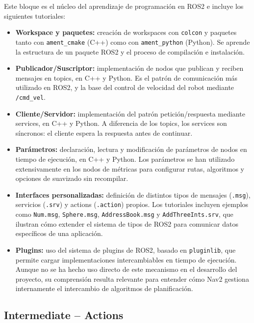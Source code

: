 Este bloque es el núcleo del aprendizaje de programación en ROS2 e incluye los siguientes tutoriales:

\begin{itemize}
    \item \textbf{Workspace y paquetes:} creación de workspaces con \texttt{colcon} y paquetes tanto con \texttt{ament\_cmake} (C++) como con \texttt{ament\_python} (Python). Se aprende la estructura de un paquete ROS2 y el proceso de compilación e instalación.

    \item \textbf{Publicador/Suscriptor:} implementación de nodos que publican y reciben mensajes en topics, en C++ y Python. Es el patrón de comunicación más utilizado en ROS2, y la base del control de velocidad del robot mediante \texttt{/cmd\_vel}.

    \item \textbf{Cliente/Servidor:} implementación del patrón petición/respuesta mediante services, en C++ y Python. A diferencia de los topics, los services son síncronos: el cliente espera la respuesta antes de continuar.

    \item \textbf{Parámetros:} declaración, lectura y modificación de parámetros de nodos en tiempo de ejecución, en C++ y Python. Los parámetros se han utilizado extensivamente en los nodos de métricas para configurar rutas, algoritmos y opciones de suavizado sin recompilar.

    \item \textbf{Interfaces personalizadas:} definición de distintos tipos de mensajes (\texttt{.msg}), servicios (\texttt{.srv}) y actions (\texttt{.action}) propios. Los tutoriales incluyen ejemplos como \texttt{Num.msg}, \texttt{Sphere.msg}, \texttt{AddressBook.msg} y \texttt{AddThreeInts.srv}, que ilustran cómo extender el sistema de tipos de ROS2 para comunicar datos específicos de una aplicación.

    \item \textbf{Plugins:} uso del sistema de plugins de ROS2, basado en \texttt{pluginlib}, que permite cargar implementaciones intercambiables en tiempo de ejecución. Aunque no se ha hecho uso directo de este mecanismo en el desarrollo del proyecto, su comprensión resulta relevante para entender cómo Nav2 gestiona internamente el intercambio de algoritmos de planificación.
\end{itemize}

\subsection{Intermediate -- Actions}

